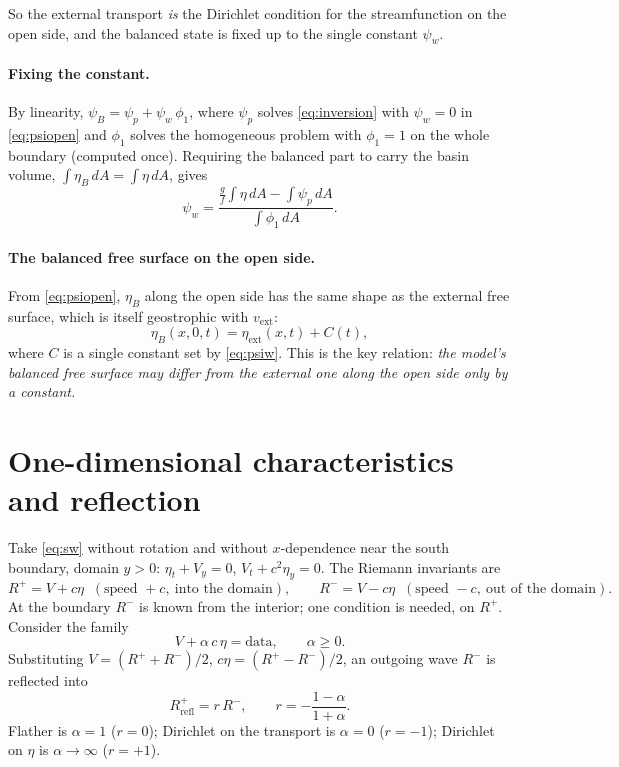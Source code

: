 \documentclass[11pt]{article}
\newcommand{\ext}{\mathrm{ext}}
\begin{document}
So the external transport \emph{is} the Dirichlet condition for the streamfunction on the open side, and the
balanced state is fixed up to the single constant $\psi_w$.

\paragraph{Fixing the constant.} By linearity, $\psi_B = \psi_p + \psi_w\,\phi_1$, where $\psi_p$ solves
\eqref{eq:inversion} with $\psi_w=0$ in \eqref{eq:psiopen} and $\phi_1$ solves the homogeneous problem with
$\phi_1=1$ on the whole boundary (computed once). Requiring the balanced part to carry the basin volume,
$\int \eta_B\,dA = \int \eta\,dA$, gives
\begin{equation}
  \psi_w = \frac{\tfrac{g}{f}\int\eta\,dA - \int\psi_p\,dA}{\int\phi_1\,dA}.
  \label{eq:psiw}
\end{equation}

\paragraph{The balanced free surface on the open side.} From \eqref{eq:psiopen}, $\eta_B$ along the open side has
the same shape as the external free surface, which is itself geostrophic with $v_\ext$:
\begin{equation}
  \eta_B(x,0,t) = \eta_\ext(x,t) + C(t),
  \label{eq:etaB}
\end{equation}
where $C$ is a single constant set by \eqref{eq:psiw}. This is the key relation: \emph{the model's balanced free
surface may differ from the external one along the open side only by a constant.}

\section{One-dimensional characteristics and reflection}

Take \eqref{eq:sw} without rotation and without $x$-dependence near the south boundary, domain $y>0$:
$\eta_t+V_y=0$, $V_t+c^2\eta_y=0$. The Riemann invariants are
\begin{equation}
  R^+ = V + c\eta \;\;(\text{speed } +c,\ \text{into the domain}),\qquad
  R^- = V - c\eta \;\;(\text{speed } -c,\ \text{out of the domain}).
\end{equation}
At the boundary $R^-$ is known from the interior; one condition is needed, on $R^+$. Consider the family
\begin{equation}
  V + \alpha\,c\,\eta = \text{data},\qquad \alpha\ge 0 .
\end{equation}
Substituting $V=(R^++R^-)/2$, $c\eta=(R^+-R^-)/2$, an outgoing wave $R^-$ is reflected into
\begin{equation}
  R^+_{\text{refl}} = r\,R^-,\qquad r = -\frac{1-\alpha}{1+\alpha}.
\end{equation}
Flather is $\alpha=1$ ($r=0$); Dirichlet on the transport is $\alpha=0$ ($r=-1$); Dirichlet on $\eta$ is
$\alpha\to\infty$ ($r=+1$).
\end{document}
